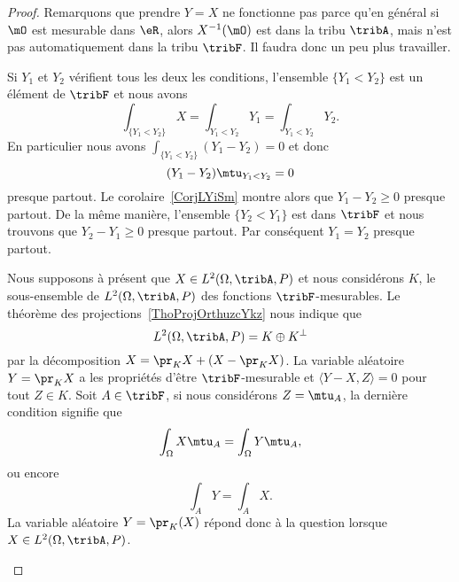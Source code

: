 \begin{proof}
	Remarquons que prendre \( Y=X\) ne fonctionne pas parce qu'en général si \( \mO\) est mesurable dans \( \eR\), alors \( X^{-1}(\mO)\) est dans la tribu \( \tribA\), mais n'est pas automatiquement dans la tribu \( \tribF\). Il faudra donc un peu plus travailler.
	\begin{subproof}
		\spitem[Unicité] Si \( Y_1\) et \( Y_2\) vérifient tous les deux les conditions, l'ensemble \( \{ Y_1<Y_2 \}\) est un élément de \( \tribF\) et nous avons
		\begin{equation}
			\int_{\{ Y_1<Y_2 \}}X=\int_{Y_1<Y_2}Y_1=\int_{Y_1<Y_2}Y_2.
		\end{equation}
		En particulier nous avons \( \int_{\{ Y_1<Y_2 \}}(Y_1-Y_2)=0\) et donc
		\begin{equation}
			(Y_1-Y_2)\mtu_{Y_1<Y_2}=0
		\end{equation}
		presque partout. Le corolaire~\ref{CorjLYiSm} montre alors que \( Y_1-Y_2\geq 0\) presque partout. De la même manière, l'ensemble \( \{ Y_2<Y_1 \}\) est dans \( \tribF\) et nous trouvons que \( Y_2-Y_1\geq 0\) presque partout. Par conséquent \( Y_1=Y_2\) presque partout.


		Nous supposons à présent que \( X\in L^2(\Omega,\tribA,P)\) et nous considérons \( K\), le sous-ensemble de \( L^2(\Omega,\tribA,P)\) des fonctions \( \tribF\)-mesurables. Le théorème des projections~\ref{ThoProjOrthuzcYkz} nous indique que
		\begin{equation}
			L^2(\Omega,\tribA,P)=K\oplus K^{\perp}
		\end{equation}
		par la décomposition \( X=\pr_{K}X+(X-\pr_KX)\). La variable aléatoire \( Y=\pr_KX\) a les propriétés d'être \( \tribF\)-mesurable et \( \langle Y-X, Z\rangle =0\) pour tout \( Z\in K\). Soit \( A\in\tribF\), si nous considérons \( Z=\mtu_A\), la dernière condition signifie que
		\begin{equation}
			\int_{\Omega}X\mtu_A=\int_{\Omega}Y\mtu_A,
		\end{equation}
		ou encore
		\begin{equation}
			\int_AY=\int_AX.
		\end{equation}
		La variable aléatoire \( Y=\pr_K(X)\) répond donc à la question lorsque \( X\in L^2(\Omega,\tribA,P)\).


\end{subproof}
\end{proof}

